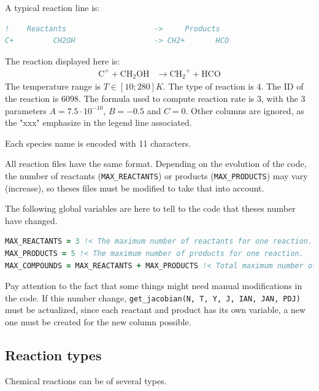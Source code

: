\documentclass[english,a4paper,twoside]{article}
\begin{document}
A typical reaction line is:
\begin{lstlisting}[language=Fortran]
!    Reactants                    ->     Products                                                A          B          C      xxxxxxxxxxxxxxxxxxxxx ITYPE Tmin   Tmax formula ID xxxxx
C+         CH2OH                  -> CH2+       HCO                                           7.500E-10 -5.000E-01  0.000E+00 0.00e+00 0.00e+00   NA  4     10    280  3  6098 1  1
\end{lstlisting}
The reaction displayed here is:
\begin{align*}
\mathrm{C^+} + \mathrm{CH_2OH} &\rightarrow \mathrm{CH_2}^+ + \mathrm{HCO}
\end{align*}
The temperature range is $T\in[10;280]\unit{K}$. The type of reaction is $4$. The ID of the reaction is $6098$. The formula used to compute reaction rate is $3$, with the 3 parameters $A=7.5\cdot 10^{-10}$, $B=-0.5$ and $C=0$. Other columns are ignored, as the "xxx" emphasize in the legend line associated.

\bigskip

Each species name is encoded with 11 characters.

All reaction files have the same format. Depending on the evolution of the code, the number of reactants (\verb|MAX_REACTANTS|) or products (\verb|MAX_PRODUCTS|) may vary (increase), so theses files must be modified to take that into account. 

The following global variables are here to tell to the code that theses number have changed. 
\begin{lstlisting}[language=Fortran]
MAX_REACTANTS = 3 !< The maximum number of reactants for one reaction.
MAX_PRODUCTS = 5 !< The maximum number of products for one reaction.
MAX_COMPOUNDS = MAX_REACTANTS + MAX_PRODUCTS !< Total maximum number of compounds for one reaction (reactants + products)
\end{lstlisting}

\begin{attention}
Pay attention to the fact that some things might need manual modifications in the code. If this number change, \verb|get_jacobian(N, T, Y, J, IAN, JAN, PDJ)| must be actualized, since each reactant and product has its own variable, a new one must be created for the new column possible. 
\end{attention}

\subsection{Reaction types}
Chemical reactions can be of several types. 
\end{document}
